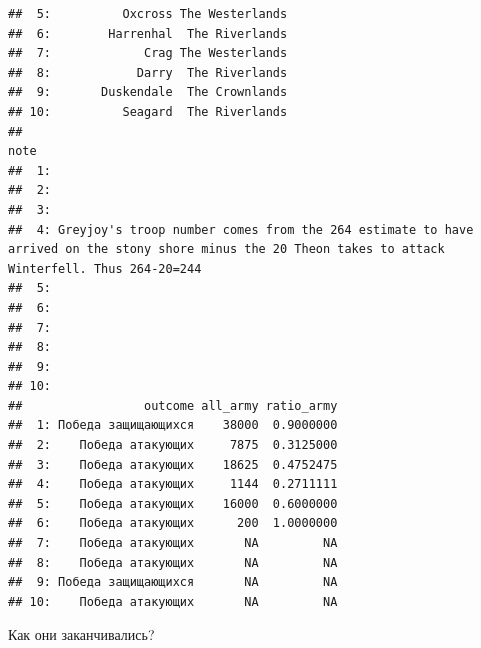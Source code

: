 \documentclass[]{book}
\begin{document}
\begin{verbatim}
##  5:          Oxcross The Westerlands
##  6:        Harrenhal  The Riverlands
##  7:             Crag The Westerlands
##  8:            Darry  The Riverlands
##  9:       Duskendale  The Crownlands
## 10:          Seagard  The Riverlands
##                                                                                                                                                     note
##  1:                                                                                                                                                     
##  2:                                                                                                                                                     
##  3:                                                                                                                                                     
##  4: Greyjoy's troop number comes from the 264 estimate to have arrived on the stony shore minus the 20 Theon takes to attack Winterfell. Thus 264-20=244
##  5:                                                                                                                                                     
##  6:                                                                                                                                                     
##  7:                                                                                                                                                     
##  8:                                                                                                                                                     
##  9:                                                                                                                                                     
## 10:                                                                                                                                                     
##                 outcome all_army ratio_army
##  1: Победа защищающихся    38000  0.9000000
##  2:    Победа атакующих     7875  0.3125000
##  3:    Победа атакующих    18625  0.4752475
##  4:    Победа атакующих     1144  0.2711111
##  5:    Победа атакующих    16000  0.6000000
##  6:    Победа атакующих      200  1.0000000
##  7:    Победа атакующих       NA         NA
##  8:    Победа атакующих       NA         NA
##  9: Победа защищающихся       NA         NA
## 10:    Победа атакующих       NA         NA
\end{verbatim}

Как они заканчивались?
\end{document}
